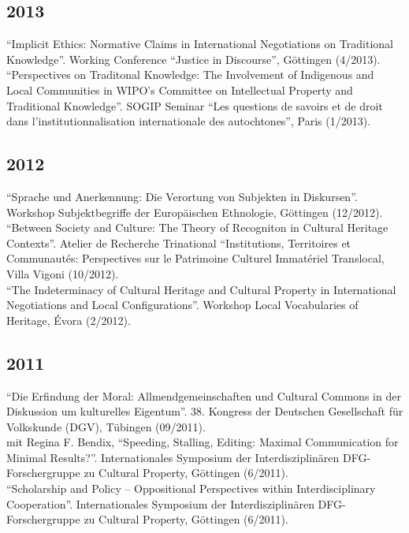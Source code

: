 \documentclass[11pt, a4paper]{article} %
\begin{document}
\subsection*{2013}
\enquote{Implicit Ethics: Normative Claims in International Negotiations on Traditional Knowledge}. Working Conference “Justice in Discourse”, Göttingen (4/2013).\\[.25cm]
\enquote{Perspectives on Traditonal Knowledge: The Involvement of Indigenous and Local Communities in WIPO’s Committee on Intellectual Property and Traditional Knowledge}. SOGIP Seminar “Les questions de savoirs et de droit dans l’institutionnalisation internationale des autochtones”, Paris (1/2013).
\subsection*{2012}
\enquote{Sprache und Anerkennung: Die Verortung von Subjekten in Diskursen}. Workshop Subjektbegriffe der Europäischen Ethnologie, Göttingen (12/2012).\\[.25cm]
\enquote{Between Society and Culture: The Theory of Recogniton in Cultural Heritage Contexts}. Atelier de Recherche Trinational “Institutions, Territoires et Communautés: Perspectives sur le Patrimoine Culturel Immatériel Translocal, Villa Vigoni (10/2012).\\[.25cm]
\enquote{The Indeterminacy of Cultural Heritage and Cultural Property in International Negotiations and Local Configurations}. Workshop Local Vocabularies of Heritage, Évora (2/2012).
\subsection*{2011}
\enquote{Die Erfindung der Moral: Allmendgemeinschaften und Cultural Commons in der Diskussion um kulturelles Eigentum}. 38. Kongress der Deutschen Gesellschaft für Volkskunde (DGV), Tübingen (09/2011).\\[.25cm]
mit Regina F. Bendix, \enquote{Speeding, Stalling, Editing: Maximal Communication for Minimal Results?}. Internationales Symposium der Interdisziplinären DFG-Forschergruppe zu Cultural Property, Göttingen (6/2011).\\[.25cm]
\enquote{Scholarship and Policy – Oppositional Perspectives within Interdisciplinary Cooperation}. Internationales Symposium der Interdisziplinären DFG-Forschergruppe zu Cultural Property, Göttingen (6/2011).
\end{document}
